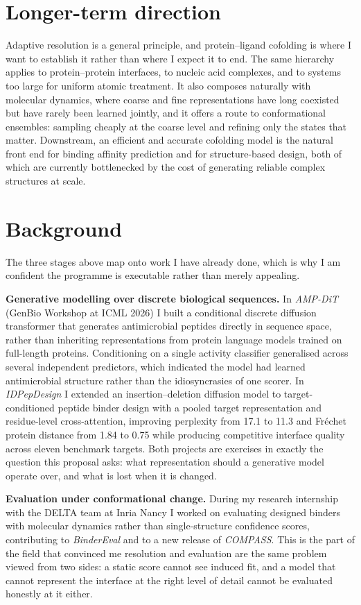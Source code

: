 \documentclass[11pt]{article}
\begin{document}
\section*{Longer-term direction}

Adaptive resolution is a general principle, and protein--ligand cofolding is where I want to
establish it rather than where I expect it to end. The same hierarchy applies to protein--protein
interfaces, to nucleic acid complexes, and to systems too large for uniform atomic treatment.
It also composes naturally with molecular dynamics, where coarse and fine representations have long
coexisted but have rarely been learned jointly, and it offers a route to conformational ensembles:
sampling cheaply at the coarse level and refining only the states that matter. Downstream, an
efficient and accurate cofolding model is the natural front end for binding affinity prediction and
for structure-based design, both of which are currently bottlenecked by the cost of generating
reliable complex structures at scale.

\section*{Background}

The three stages above map onto work I have already done, which is why I am confident the programme
is executable rather than merely appealing.

\textbf{Generative modelling over discrete biological sequences.} In \emph{AMP-DiT} (GenBio Workshop
at ICML 2026) I built a conditional discrete diffusion transformer that generates antimicrobial
peptides directly in sequence space, rather than inheriting representations from protein language
models trained on full-length proteins. Conditioning on a single activity classifier generalised
across several independent predictors, which indicated the model had learned antimicrobial structure
rather than the idiosyncrasies of one scorer. In \emph{IDPepDesign} I extended an insertion--deletion
diffusion model to target-conditioned peptide binder design with a pooled target representation and
residue-level cross-attention, improving perplexity from 17.1 to 11.3 and Fr\'echet protein distance
from 1.84 to 0.75 while producing competitive interface quality across eleven benchmark targets.
Both projects are exercises in exactly the question this proposal asks: what representation should a
generative model operate over, and what is lost when it is changed.

\textbf{Evaluation under conformational change.} During my research internship with the DELTA team at
Inria Nancy I worked on evaluating designed binders with molecular dynamics rather than
single-structure confidence scores, contributing to \emph{BinderEval} and to a new release of
\emph{COMPASS}. This is the part of the field that convinced me resolution and evaluation are the
same problem viewed from two sides: a static score cannot see induced fit, and a model that cannot
represent the interface at the right level of detail cannot be evaluated honestly at it either.
\end{document}
